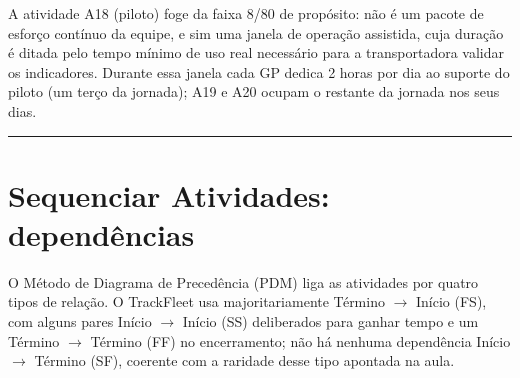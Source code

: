 \documentclass[11pt,a4paper]{article}
\newcommand{\separador}{\par\vspace{2mm}\hrule\vspace{4mm}}
\begin{document}
\noindent A atividade A18 (piloto) foge da faixa 8/80 de propósito: não é um pacote de esforço contínuo da equipe, e sim uma janela de operação assistida, cuja duração é ditada pelo tempo mínimo de uso real necessário para a transportadora validar os indicadores. Durante essa janela cada GP dedica 2 horas por dia ao suporte do piloto (um terço da jornada); A19 e A20 ocupam o restante da jornada nos seus dias.

\separador

\section{Sequenciar Atividades: dependências}\label{cro:dependencias}

\noindent O Método de Diagrama de Precedência (PDM) liga as atividades por quatro tipos de relação. O TrackFleet usa majoritariamente Término $\to$ Início (FS), com alguns pares Início $\to$ Início (SS) deliberados para ganhar tempo e um Término $\to$ Término (FF) no encerramento; não há nenhuma dependência Início $\to$ Término (SF), coerente com a raridade desse tipo apontada na aula.
\end{document}
